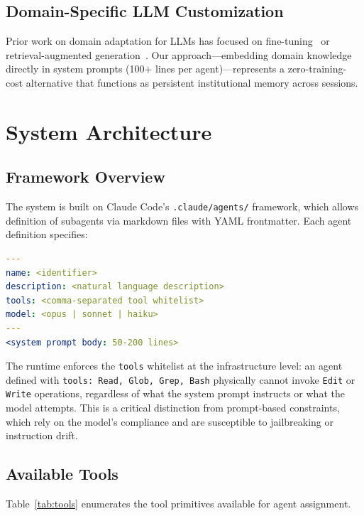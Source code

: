 \documentclass[11pt,a4paper]{article}
\begin{document}
\subsection{Domain-Specific LLM Customization}

Prior work on domain adaptation for LLMs has focused on fine-tuning~\cite{gururangan2020} or retrieval-augmented generation~\cite{lewis2020}. Our approach---embedding domain knowledge directly in system prompts (100+ lines per agent)---represents a zero-training-cost alternative that functions as persistent institutional memory across sessions.

\section{System Architecture}

\subsection{Framework Overview}

The system is built on Claude Code's \texttt{.claude/agents/} framework, which allows definition of subagents via markdown files with YAML frontmatter. Each agent definition specifies:

\begin{lstlisting}[language=yaml, caption={Agent definition schema}]
---
name: <identifier>
description: <natural language description>
tools: <comma-separated tool whitelist>
model: <opus | sonnet | haiku>
---
<system prompt body: 50-200 lines>
\end{lstlisting}

The runtime enforces the \texttt{tools} whitelist at the infrastructure level: an agent defined with \texttt{tools: Read, Glob, Grep, Bash} physically cannot invoke \texttt{Edit} or \texttt{Write} operations, regardless of what the system prompt instructs or what the model attempts. This is a critical distinction from prompt-based constraints, which rely on the model's compliance and are susceptible to jailbreaking or instruction drift.

\subsection{Available Tools}

Table~\ref{tab:tools} enumerates the tool primitives available for agent assignment.
\end{document}
